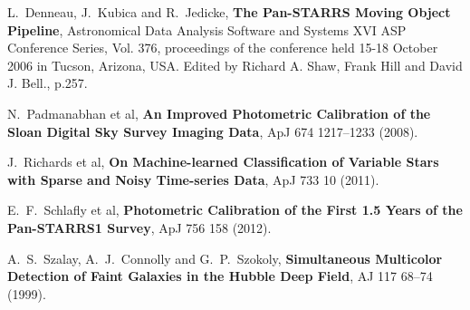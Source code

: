 \documentclass[12pt]{article}
\begin{document}
\begin{thebibliography}{10}
 L.~Denneau, J.~Kubica and R.~Jedicke,
   \textbf{The Pan-STARRS Moving Object Pipeline}, Astronomical Data
  Analysis Software and Systems XVI ASP Conference Series, Vol. 376,
  proceedings of the conference held 15-18 October 2006 in Tucson,
  Arizona, USA. Edited by Richard A. Shaw, Frank Hill and David
  J. Bell., p.257.

 N.~Padmanabhan et al,
  \textbf{An Improved Photometric Calibration of the Sloan Digital Sky Survey Imaging Data},
  ApJ 674 1217--1233 (2008).

 J.~Richards et al,
  \textbf{On Machine-learned Classification of Variable Stars with Sparse and Noisy Time-series Data},
  ApJ 733 10 (2011).

 E.~F.~Schlafly et al,
  \textbf{Photometric Calibration of the First 1.5 Years of the Pan-STARRS1 Survey},
  ApJ 756 158 (2012).

 A.~S.~Szalay, A.~J.~Connolly and G.~P.~Szokoly,
  \textbf{Simultaneous Multicolor Detection of Faint Galaxies in the Hubble Deep Field},
  AJ 117 68--74 (1999).

\end{thebibliography}
\end{document}
